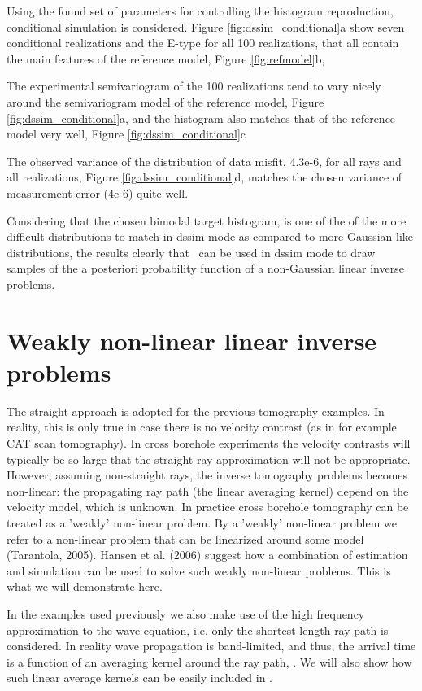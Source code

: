 \documentclass[12t]{article}
\begin{document}
Using the found set of parameters for controlling the histogram reproduction, conditional simulation is considered. 
Figure \ref{fig:dssim_conditional}a show seven conditional
realizations and the E-type for all 100 realizations, that all contain the main features of the reference model, Figure \ref{fig:refmodel}b, 

The experimental 
semivariogram of the 100 realizations tend to vary nicely around the
semivariogram model of the reference model,  Figure \ref{fig:dssim_conditional}a, and the histogram also
matches that of the reference model very well,  Figure \ref{fig:dssim_conditional}c 

The observed variance of the distribution of data misfit, 4.3e-6, for
all rays and all realizations, Figure \ref{fig:dssim_conditional}d, matches the chosen
variance of measurement error (4e-6) quite well.

Considering that the chosen bimodal target histogram, is one of the of the more difficult distributions to match in dssim mode as compared to more Gaussian like distributions, the results
clearly that \visimprog~can be used in dssim mode to draw samples of
the a posteriori probability function of a non-Gaussian linear inverse
problems. 


\section{Weakly non-linear linear inverse problems}
The straight approach is adopted for the previous tomography examples. In reality, this is only true in case there is no velocity contrast (as in for example CAT scan tomography). In cross borehole experiments the velocity contrasts will typically be so large that the straight ray approximation will not be appropriate. However, assuming non-straight rays, the inverse tomography problems becomes non-linear: the propagating ray path (the linear averaging kernel) depend on the velocity model, which is unknown.
In practice cross borehole tomography can be treated as a 'weakly' non-linear problem.  By a 'weakly' non-linear problem we refer to a non-linear problem that can be linearized around some model (Tarantola, 2005). Hansen et al. (2006) suggest how a combination of estimation and simulation can be used to solve such weakly non-linear problems. This is what we will demonstrate here.

In the examples used previously we also make use of the high frequency approximation to the wave equation, i.e. only the shortest length ray path is considered. In reality wave propagation is band-limited, and thus, the arrival time is a function of an averaging kernel around the ray path, \cite{Woodward}. 
We will also show how such linear average kernels can be easily included in \visimprog.
\end{document}
